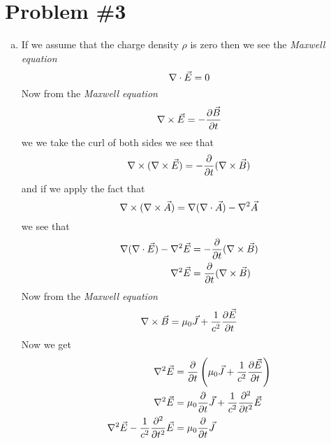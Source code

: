 \documentclass[11pt]{article}
\numberwithin{equation}{section}
\newcommand{\grad}{\bold\nabla}
\begin{document}
\section{Problem \#3}
\begin{enumerate}[(a)]
\item
If we assume that the charge density $\rho$ is zero then we see the \emph{Maxwell equation}
\begin{equation}
\grad\cdot\vec{E} = 0
\label{Max1}
\end{equation}
Now from the \emph{Maxwell equation}
\begin{equation}
\grad\times\vec{E} = -\frac{\partial\vec{B}}{\partial t}
\label{Max2}
\end{equation}
we we take the curl of both sides we see that
$$\grad\times(\grad\times\vec{E}) = -\frac{\partial}{\partial t}(\grad\times\vec{B})$$
and if we apply the fact that
$$\grad\times(\grad\times\vec{A}) = \grad(\grad\cdot\vec{A})-\grad^2\vec{A}$$
we see that
\begin{align*}
\grad(\grad\cdot\vec{E})-\grad^2\vec{E} &= -\frac{\partial}{\partial t}(\grad\times\vec{B})\\
\grad^2\vec{E} &= \frac{\partial}{\partial t}(\grad\times\vec{B})
\end{align*}
Now from the \emph{Maxwell equation}
\begin{equation}
\grad\times\vec{B} = \mu_0\vec{J}+\frac{1}{c^2}\frac{\partial\vec{E}}{\partial t}
\label{Max3}
\end{equation}
Now we get
\begin{align*}
\grad^2\vec{E} &= \frac{\partial}{\partial t}\left(\mu_0\vec{J}+\frac{1}{c^2}\frac{\partial\vec{E}}{\partial t}\right)\\
\grad^2\vec{E} &= \mu_0\frac{\partial}{\partial t}\vec{J}+\frac{1}{c^2}\frac{\partial^2}{\partial t^2}\vec{E}\\
\grad^2\vec{E} - \frac{1}{c^2}\frac{\partial^2}{\partial t^2}\vec{E} &= \mu_0\frac{\partial}{\partial t}\vec{J}
\end{align*}


\end{enumerate}
\end{document}
